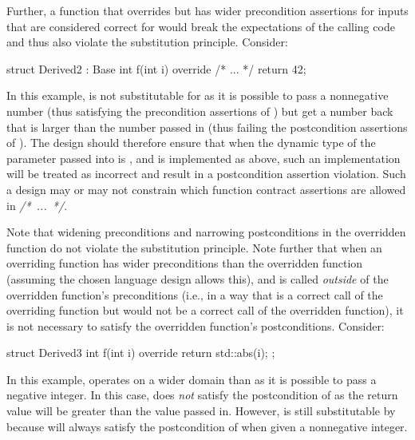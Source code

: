 Further, a function that overrides  but has wider precondition assertions for inputs that are considered correct for  would break the expectations of the calling code and thus also violate the substitution principle. Consider:

\begin{codeblock}
struct Derived2 : Base {
  int f(int i) override /* ... */ {
    return 42;
  }
}
\end{codeblock}

In this example,  is not substitutable for  as it is possible to pass a nonnegative number (thus satisfying the precondition assertions of ) but get a number back that is larger than the number passed in (thus failing the postcondition assertions of ). The design should therefore ensure that when the dynamic type of the parameter passed into   is , and  is implemented as above, such an implementation will be treated as incorrect and result in a postcondition assertion violation. Such a design may or may not constrain which function contract assertions are allowed in \mbox{\emph{/* ... */}}.


Note that widening preconditions and narrowing postconditions in the overridden function do not violate the substitution principle. Note further that when an overriding function has wider preconditions than the overridden function (assuming the chosen language design allows this), and is called \emph{outside} of the overridden function's preconditions (i.e., in a way that is a correct call of the overriding function but would not be a correct call of the overridden function), it is not necessary to satisfy the overridden function's postconditions. Consider:

\begin{codeblock}
struct Derived3 {
  int f(int i) override {
    return std::abs(i);
  }
};
\end{codeblock}
In this example,  operates on a wider domain than  as it is possible to pass a negative integer. In this case,   does \emph{not} satisfy the postcondition of  as the return value will be greater than the value passed in. However,  is still substitutable by  because  will always satisfy the postcondition of  when given a nonnegative integer.

